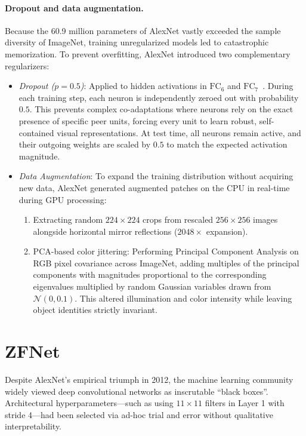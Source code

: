 \paragraph{Dropout and data augmentation.}
Because the 60.9 million parameters of AlexNet vastly exceeded the sample diversity of ImageNet, training unregularized models led to catastrophic memorization. To prevent overfitting, AlexNet introduced two complementary regularizers:
\begin{itemize}[leftmargin=*]
  \item \textit{Dropout ($p=0.5$)}: Applied to hidden activations in $\text{FC}_6$ and $\text{FC}_7$~\cite{srivastava2014dropout}. During each training step, each neuron is independently zeroed out with probability $0.5$. This prevents complex co-adaptations where neurons rely on the exact presence of specific peer units, forcing every unit to learn robust, self-contained visual representations. At test time, all neurons remain active, and their outgoing weights are scaled by $0.5$ to match the expected activation magnitude.
  \item \textit{Data Augmentation}: To expand the training distribution without acquiring new data, AlexNet generated augmented patches on the CPU in real-time during GPU processing:
    \begin{enumerate}[noitemsep]
      \item Extracting random $224 \times 224$ crops from rescaled $256 \times 256$ images alongside horizontal mirror reflections ($2048\times$ expansion).
      \item PCA-based color jittering: Performing Principal Component Analysis on RGB pixel covariance across ImageNet, adding multiples of the principal components with magnitudes proportional to the corresponding eigenvalues multiplied by random Gaussian variables drawn from $\mathcal{N}(0, 0.1)$. This altered illumination and color intensity while leaving object identities strictly invariant.
    \end{enumerate}
\end{itemize}

\section{ZFNet}
\label{sec:zfnet_model}

Despite AlexNet's empirical triumph in 2012, the machine learning community widely viewed deep convolutional networks as inscrutable ``black boxes''. Architectural hyperparameters---such as using $11 \times 11$ filters in Layer 1 with stride 4---had been selected via ad-hoc trial and error without qualitative interpretability.

